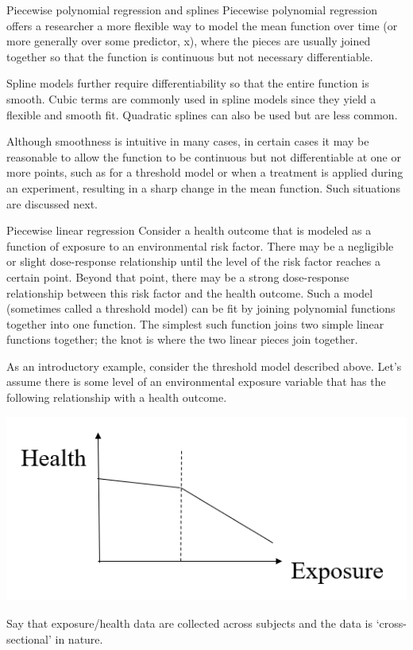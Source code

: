 \documentclass[
  9pt,
  ignorenonframetext,
]{beamer}
\begin{document}
\begin{frame}{Piecewise polynomial regression and splines}
\protect\hypertarget{piecewise-polynomial-regression-and-splines}{}
Piecewise polynomial regression offers a researcher a more flexible way
to model the mean function over time (or more generally over some
predictor, x), where the pieces are usually joined together so that the
function is continuous but not necessary differentiable.

Spline models further require differentiability so that the entire
function is smooth. Cubic terms are commonly used in spline models since
they yield a flexible and smooth fit. Quadratic splines can also be used
but are less common.

Although smoothness is intuitive in many cases, in certain cases it may
be reasonable to allow the function to be continuous but not
differentiable at one or more points, such as for a threshold model or
when a treatment is applied during an experiment, resulting in a sharp
change in the mean function. Such situations are discussed next.
\end{frame}

\begin{frame}{Piecewise linear regression}
\protect\hypertarget{piecewise-linear-regression}{}
Consider a health outcome that is modeled as a function of exposure to
an environmental risk factor. There may be a negligible or slight
dose-response relationship until the level of the risk factor reaches a
certain point. Beyond that point, there may be a strong dose-response
relationship between this risk factor and the health outcome. Such a
model (sometimes called a threshold model) can be fit by joining
polynomial functions together into one function. The simplest such
function joins two simple linear functions together; the knot is where
the two linear pieces join together.
\end{frame}

\begin{frame}{}
\protect\hypertarget{section}{}
As an introductory example, consider the threshold model described
above. Let's assume there is some level of an environmental exposure
variable that has the following relationship with a health outcome.

\begin{center}\includegraphics[width=0.7\linewidth]{figs_L12/f1} \end{center}

Say that exposure/health data are collected across subjects and the data
is `cross-sectional' in nature.
\end{frame}
\end{document}
